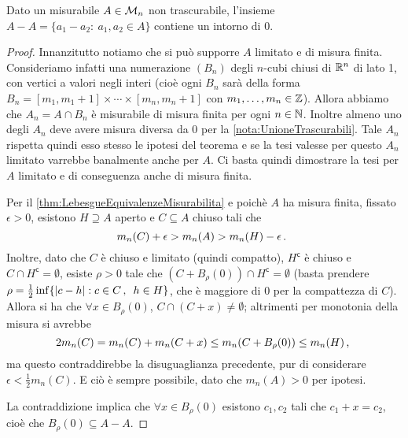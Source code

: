 \begin{theorem}[Steinhaus]\label{thm:Steinhaus}
	Dato un misurabile $A\in\mathcal M_n$ non trascurabile, l'insieme $A-A=\{a_1-a_2:\ a_1,a_2\in A\}$ contiene un intorno di $0$.
\end{theorem}
\begin{proof}
	Innanzitutto notiamo che si può supporre $A$ limitato e di misura finita. Consideriamo infatti una numerazione $(B_n)$ degli $n$-cubi chiusi di $\mathbb R^n$ di lato 1, con vertici a valori negli interi (cioè ogni $B_n$ sarà della forma $B_n=[m_1,m_1+1]\times\cdots\times[m_n,m_n+1]$ con $m_1,\dots,m_n\in\mathbb Z$). Allora abbiamo che $A_n=A\cap B_n$ è misurabile di misura finita per ogni $n\in\mathbb N$. Inoltre almeno uno degli $A_n$ deve avere misura diversa da 0 per la \cref{nota:UnioneTrascurabili}. Tale $A_n$ rispetta quindi esso stesso le ipotesi del teorema e se la tesi valesse per questo $A_n$ limitato varrebbe banalmente anche per $A$. Ci basta quindi dimostrare la tesi per $A$ limitato e di conseguenza anche di misura finita.
	
	Per il \cref{thm:LebesgueEquivalenzeMisurabilita} e poichè $A$ ha misura finita, fissato $\epsilon>0$, esistono $H\supseteq A$ aperto e $C\subseteq A$ chiuso tali che
	\[
		m_n(C)+\epsilon > m_n(A) > m_n(H)-\epsilon\, \text{. }
	\]
	Inoltre, dato che $C$ è chiuso e limitato (quindi compatto), $H^\mathsf{c}$ è chiuso e $C \cap H^\mathsf{c} = \emptyset$, esiste $\rho>0$ tale che
	$(C+B_{\rho}(0)) \cap H^\mathsf{c} = \emptyset$ (basta prendere $\rho = \frac{1}{2}\inf\{|c-h|:c\in C\, \text{, }\ h\in H\}$, che è maggiore di 0 per la compattezza di $C$).
	Allora si ha che $\forall x\in B_{\rho}(0)$, $C \cap (C+x) \neq \emptyset$; altrimenti per monotonia della misura si avrebbe
	\[
		2m_n(C) = m_n(C)+m_n(C+x) \leq m_n(C+B_{\rho}(0)) \leq m_n(H)\, \text{, }
	\]
	ma questo contraddirebbe la disuguaglianza precedente, pur di considerare $\epsilon< \frac{1}{2}m_n(C)$. E ciò è sempre possibile, dato che
	$m_n(A) > 0$ per ipotesi.
	
	La contraddizione implica che $\forall x\in B_{\rho}(0)$ esistono $c_1,c_2$ tali che $c_1+x=c_2$, cioè che $B_{\rho}(0) \subseteq A-A$.
\end{proof}


